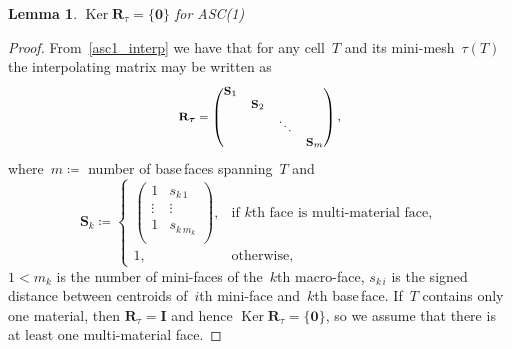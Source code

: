 \documentclass[12pt]{article}
\newcommand{\vect}[1]{\boldsymbol{\mathbf{#1}}}
\newcommand{\bcell}{T}
\newcommand{\mmesh}{{\vect{\mathcal \tau}}}
\newcommand{\bfaces}[1][]{{\vect{\mathcal F}_{\text{#1}}}}
\DeclareMathOperator{\Ker}{Ker}
\newtheorem{lemma}[theorem]{Lemma}
\begin{document}
	\begin{lemma}\label{thm:asc1}
		$\Ker\vect R_\mmesh = \{ {\vect 0} \}$ for ASC(1)
	\end{lemma}
	\begin{proof}
		From~\eqref{asc1_interp} we have that for any cell~$\bcell$ and its mini-mesh~$\mmesh(T)$
		the interpolating matrix may be written as
		\begin{equation}\label{r_wo_mixed}\footnotesize
			\vect R_\mmesh =
			\begin{pmatrix}
				\vect S_1 & & & \\
				& \vect S_2 & & \\
				& & \ddots & \\
				& & & \vect S_m
			\end{pmatrix},
		\end{equation}
		where~$m \coloneqq$ number of base\,faces spanning~$\bcell$ and
		\begin{equation*}
			\vect S_k \coloneqq
			\begin{cases}
				\begin{pmatrix}
					1 &  s_{k\,1} \\
					\vdots & \vdots \\
					1 &  s_{k\,m_k} \\
				\end{pmatrix}, & \text{if }k\text{th face is multi-material face}, \\
				1, & \text{otherwise},
			\end{cases}
		\end{equation*}
		$1 < m_k$ is the number of mini-faces of the~$k$th macro-face, $ s_{k\,i}$ is the signed distance between centroids of~$i$th mini-face and~$k$th base\,face. If~$\bcell$ contains only one material, then $\vect R_\mmesh = \vect I$ and hence $\Ker\vect R_\mmesh = \{ {\vect 0} \}$, so we assume that there is at least one multi-material  face.
		

\end{proof}
\end{document}
